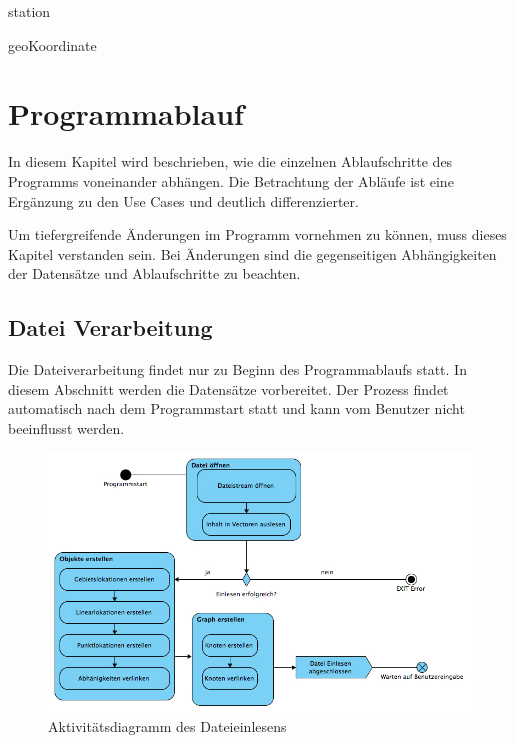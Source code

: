 \documentclass[12pt, a4paper, ngerman]{article}
\begin{document}
\begin{attribut}{station}
\end{attribut}

\begin{attribut}{geoKoordinate}
\end{attribut}	


\section{Programmablauf}
In diesem Kapitel wird beschrieben, wie die einzelnen Ablaufschritte des Programms voneinander abhängen. Die Betrachtung der Abläufe ist eine Ergänzung zu den Use Cases und deutlich differenzierter.

Um tiefergreifende Änderungen im Programm vornehmen zu können, muss dieses Kapitel verstanden sein. Bei Änderungen sind die gegenseitigen Abhängigkeiten der Datensätze und Ablaufschritte zu beachten. 

\subsection{Datei Verarbeitung\label{dateiVerarbeitung}}
Die Dateiverarbeitung findet nur zu Beginn des Programmablaufs statt. In diesem Abschnitt werden die Datensätze vorbereitet. Der Prozess findet automatisch nach dem Programmstart statt und kann vom Benutzer nicht beeinflusst werden.

\begin{figure}[H] 
  \centering
     \includegraphics[width=1.0\textwidth]{Grafiken/aktivitaetsDiagrammDateiEinlesen.jpg}
  \caption{Aktivitätsdiagramm des Dateieinlesens}
  \label{fig:uebersichtDateiEinlesen}
\end{figure}
\end{document}

